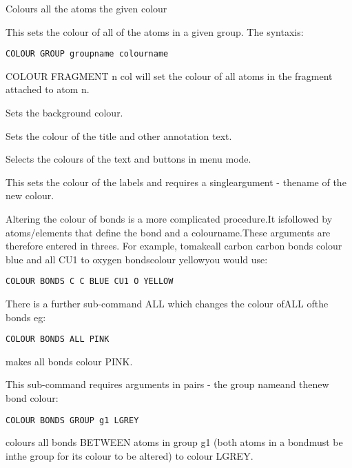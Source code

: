 \documentclass[10pt,a4paper]{report}
\begin{document}
Colours all the atoms the given colour

\bigskip{}

This sets the colour of all of the atoms in a given group. The syntaxis:\small\begin{verbatim}COLOUR GROUP groupname colourname\end{verbatim}\normalsize



\bigskip{}COLOUR FRAGMENT n col will set the colour of all atoms in the fragment attached to atom n.

\bigskip{}Sets the background colour.

\bigskip{}Sets the colour of the title and other annotation text.

\bigskip{}

\bigskip{}Selects the colours of the text and buttons in menu mode.

\bigskip{}

This sets the colour of the labels and requires a singleargument - thename of the new colour.

\bigskip{}

Altering the colour of bonds is a more complicated procedure.It isfollowed by atoms/elements that define the bond and a colourname.These arguments are therefore entered in threes. For example, tomakeall carbon carbon bonds colour blue and all CU1 to oxygen bondscolour yellowyou would use:\small\begin{verbatim}COLOUR BONDS C C BLUE CU1 O YELLOW\end{verbatim}\normalsize



\bigskip{}There is a further sub-command ALL which changes the colour ofALL ofthe bonds eg:\small\begin{verbatim}COLOUR BONDS ALL PINK\end{verbatim}\normalsize

makes all bonds colour PINK.

\bigskip{}

This sub-command requires arguments in pairs - the group nameand thenew bond colour:\small\begin{verbatim}COLOUR BONDS GROUP g1 LGREY\end{verbatim}\normalsize

colours all bonds BETWEEN atoms in group g1 (both atoms in a bondmust be inthe group for its colour to be altered) to colour LGREY.
\end{document}

